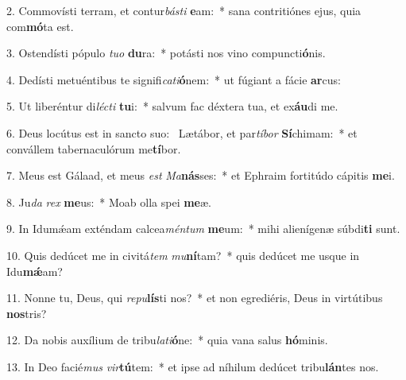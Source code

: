 2. Commovísti terram, et contur\textit{bás}\textit{ti} \textbf{e}am:~*  sana contritiónes ejus, quia com\textbf{mó}ta est.\

3. Ostendísti pópulo \textit{tu}\textit{o} \textbf{du}ra:~*  potásti nos vino compuncti\textbf{ó}nis.\

4. Dedísti metuéntibus te signifi\textit{ca}\textit{ti}\textbf{ó}nem:~*  ut fúgiant a fácie \textbf{ar}cus:\

5. Ut liberéntur di\textit{léc}\textit{ti} \textbf{tu}i:~*  salvum fac déxtera tua, et ex\textbf{áu}di me.\

6. Deus locútus est in sancto suo: \dag\  Lætábor, et par\textit{tí}\textit{bor} \textbf{Sí}chimam:~*  et convállem tabernaculórum me\textbf{tí}bor.\

7. Meus est Gálaad, et meus \textit{est} \textit{Ma}\textbf{nás}ses:~*  et Ephraim fortitúdo cápitis \textbf{me}i.\

8. Ju\textit{da} \textit{rex} \textbf{me}us:~*  Moab olla spei \textbf{me}æ.\

9. In Idumǽam exténdam calcea\textit{mén}\textit{tum} \textbf{me}um:~*  mihi alienígenæ súbdi\textbf{ti} sunt.\

10. Quis dedúcet me in civitá\textit{tem} \textit{mu}\textbf{ní}tam?~*  quis dedúcet me usque in Idu\textbf{mǽ}am?\

11. Nonne tu, Deus, qui \textit{re}\textit{pu}\textbf{lís}ti nos?~*  et non egrediéris, Deus in virtútibus \textbf{nos}tris?\

12. Da nobis auxílium de tribu\textit{la}\textit{ti}\textbf{ó}ne:~*  quia vana salus \textbf{hó}minis.\

13. In Deo facié\textit{mus} \textit{vir}\textbf{tú}tem:~*  et ipse ad níhilum dedúcet tribu\textbf{lán}tes nos.\

